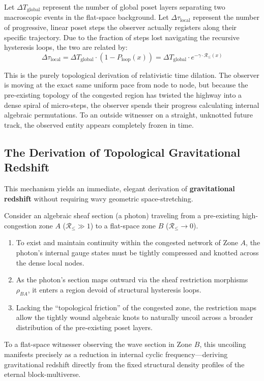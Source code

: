 \documentclass[12pt,letterpaper]{article}
\begin{document}
Let $\Delta T_{\text{global}}$ represent the number of global poset layers separating two macroscopic events in the flat-space background. Let $\Delta \tau_{\text{local}}$ represent the number of progressive, linear poset steps the observer actually registers along their specific trajectory. Due to the fraction of steps lost navigating the recursive hysteresis loops, the two are related by:
$$\Delta \tau_{\text{local}} = \Delta T_{\text{global}} \cdot \left( 1 - P_{\text{loop}}(x) \right) = \Delta T_{\text{global}} \cdot e^{-\gamma \cdot \mathcal{R}_{\le}(x)}$$

This is the purely topological derivation of relativistic time dilation. The observer is moving at the exact same uniform pace from node to node, but because the pre-existing topology of the congested region has twisted the highway into a dense spiral of micro-steps, the observer spends their progress calculating internal algebraic permutations. To an outside witnesser on a straight, unknotted future track, the observed entity appears completely frozen in time.

\subsection{The Derivation of Topological Gravitational Redshift}
This mechanism yields an immediate, elegant derivation of \textbf{gravitational redshift} without requiring wavy geometric space-stretching.

Consider an algebraic sheaf section (a photon) traveling from a pre-existing high-congestion zone $A$ ($\mathcal{R}_{\le} \gg 1$) to a flat-space zone $B$ ($\mathcal{R}_{\le} \to 0$).
\begin{enumerate}
    \item To exist and maintain continuity within the congested network of Zone $A$, the photon's internal gauge states must be tightly compressed and knotted across the dense local nodes.
    \item As the photon's section maps outward via the sheaf restriction morphisms $\rho_{BA}$, it enters a region devoid of structural hysteresis loops.
    \item Lacking the ``topological friction'' of the congested zone, the restriction maps allow the tightly wound algebraic knots to naturally uncoil across a broader distribution of the pre-existing poset layers.
\end{enumerate}
To a flat-space witnesser observing the wave section in Zone $B$, this uncoiling manifests precisely as a reduction in internal cyclic frequency---deriving gravitational redshift directly from the fixed structural density profiles of the eternal block-multiverse.
\end{document}
